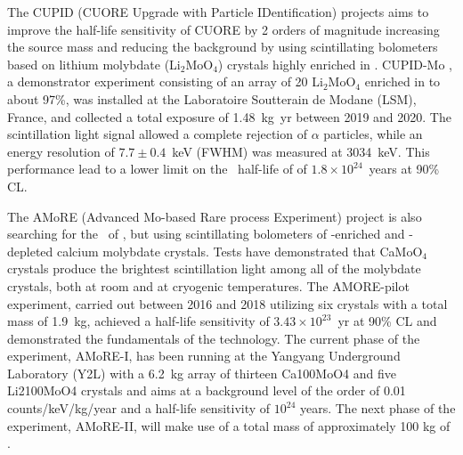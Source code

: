 The CUPID (CUORE Upgrade with Particle IDentification) \cite{CUPID:2019imh} projects aims to improve the half-life sensitivity of CUORE by 2 orders of magnitude increasing the source mass and reducing the background by using scintillating bolometers based on lithium molybdate (Li$_2$MoO$_4$) crystals highly enriched in . CUPID-Mo \cite{Augier:2022znx}, a demonstrator experiment consisting of an array of 20 Li$_2$MoO$_4$ enriched in  to about 97\%, was installed at the Laboratoire Soutterain de Modane (LSM), France, and collected a total exposure of 1.48~kg~yr between 2019 and 2020. The scintillation light signal allowed a complete rejection of $\alpha$ particles, while an energy resolution of $7.7\pm0.4$~keV (FWHM) was measured at 3034~keV. This performance lead to a lower limit on the \bbonu\ half-life of  of $1.8\times10^{24}$~years at 90\% CL. 

The AMoRE \cite{Kim:2022uce} (Advanced Mo-based Rare process Experiment) project is also searching for the \bbonu\ of , but using scintillating bolometers of -enriched and -depleted calcium molybdate crystals. Tests have demonstrated that CaMoO$_4$ crystals produce the brightest scintillation light among all of the molybdate crystals, both at room and at cryogenic temperatures. The AMORE-pilot experiment, carried out between 2016 and 2018 utilizing six crystals with a total mass of 1.9~kg, achieved a half-life sensitivity of $3.43\times10^{23}$~yr at 90\% CL and demonstrated the fundamentals of the technology. The current phase of the experiment, AMoRE-I, has been running at the Yangyang Underground Laboratory (Y2L) with a 6.2~kg array of thirteen Ca100MoO4 and five Li2100MoO4 crystals and aims at a background level of the order of 0.01 counts/keV/kg/year and a half-life sensitivity of $10^{24}$ years. The next phase of the experiment, AMoRE-II, will make use of a total mass of approximately 100 kg of .
